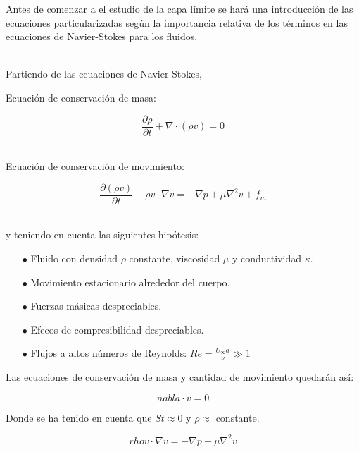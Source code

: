 \documentclass[11pt,a4paper]{article}
\begin{document}





Antes de comenzar a el estudio de la capa límite se hará una introducción de las ecuaciones particularizadas según la importancia relativa de los términos en las ecuaciones de Navier-Stokes para los fluidos.

\\

Partiendo de las ecuaciones de Navier-Stokes,

\vspace{1cm}


Ecuación de conservación de masa:


\[\frac{\partial \rho}{\partial t} + \nabla \cdot (\rho v)=0\]

\\

Ecuación de conservación de movimiento:


\[\frac{ \partial (\rho v) }{\partial{t}} + \rho v \cdot \nabla v = -\nabla p + \mu \nabla^{2} v + f_{m}\]

\\

y teniendo en cuenta las siguientes hipótesis:
\vspace{1cm}

\begin{enumerate}[\hspace*{0.5cm}]
\item[$\bullet$] Fluido con densidad $\rho$ constante, viscosidad $\mu$  y conductividad $\kappa$.
\item[$\bullet$] Movimiento estacionario alrededor del cuerpo.
\item[$\bullet$] Fuerzas másicas despreciables.
\item[$\bullet$] Efecos de compresibilidad despreciables.
\item[$\bullet$] Flujos a altos números de Reynolds: $Re=\frac{U_{\infty} a}{\nu} \gg 1 $
\end{enumerate}

\vspace{1cm}


Las ecuaciones de conservación de masa y cantidad de movimiento quedarán así:


\[nabla \cdot v=0\]


Donde se ha tenido en cuenta que $St\approx 0$ y $\rho \approx$ constante.


\[rho v \cdot \nabla v = -\nabla p + \mu \nabla^{2} v \]
\end{document}

